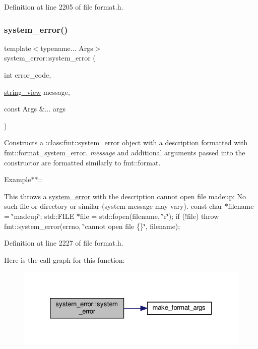 Definition at line 2205 of file format.\+h.

\mbox{\label{classsystem__error_a6761fd4c8604a59a7c79f6bfdfaf25cb}} 
\subsubsection{\texorpdfstring{system\+\_\+error()}{system\_error()}\hspace{0.1cm}{\footnotesize\ttfamily [2/2]}}
{\footnotesize\ttfamily template$<$typename... Args$>$ \\
system\+\_\+error\+::system\+\_\+error (\begin{DoxyParamCaption}\item[{int}]{error\+\_\+code,  }\item[{\hyperlink{core_8h_a17e3ff7f9ac2b8f068f719b829890036}{string\+\_\+view}}]{message,  }\item[{const Args \&...}]{args }\end{DoxyParamCaption})\hspace{0.3cm}{\ttfamily [inline]}}

Constructs a \+:class\+:{\ttfamily fmt\+::system\+\_\+error} object with a description formatted with {\ttfamily fmt\+::format\+\_\+system\+\_\+error}. {\itshape message} and additional arguments passed into the constructor are formatted similarly to {\ttfamily fmt\+::format}.

Example$\ast$$\ast$\+:\+:

This throws a \hyperlink{classsystem__error}{system\+\_\+error} with the description cannot open file \textquotesingle{}madeup\textquotesingle{}\+: No such file or directory or similar (system message may vary). const char $\ast$filename = \char`\"{}madeup\char`\"{}; std\+::\+F\+I\+LE $\ast$file = std\+::fopen(filename, \char`\"{}r\char`\"{}); if (!file) throw fmt\+::system\+\_\+error(errno, \char`\"{}cannot open file \textquotesingle{}\{\}\textquotesingle{}\char`\"{}, filename);  

Definition at line 2227 of file format.\+h.

Here is the call graph for this function\+:
\nopagebreak
\begin{figure}[H]
\begin{center}
\leavevmode
\includegraphics[width=326pt]{classsystem__error_a6761fd4c8604a59a7c79f6bfdfaf25cb_cgraph}
\end{center}
\end{figure}


